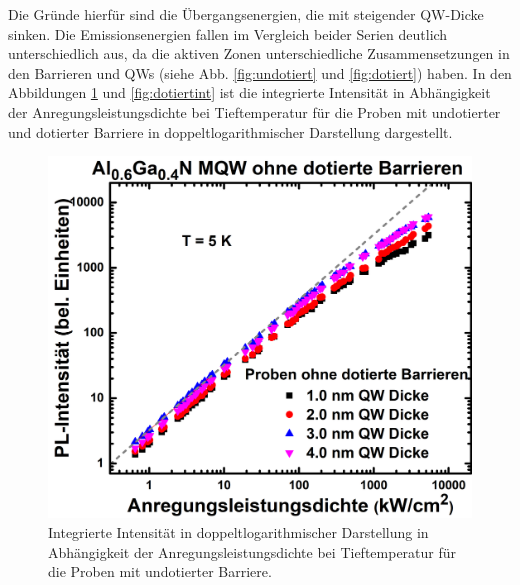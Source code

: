 \noindent 
Die Gründe hierfür sind die Übergangsenergien, die mit steigender QW-Dicke \cite{doi:10.1063/1.371241} sinken. 
Die Emissionsenergien fallen im Vergleich beider Serien deutlich unterschiedlich aus, da die aktiven Zonen unterschiedliche Zusammensetzungen in den Barrieren und QWs (siehe Abb. \ref{fig:undotiert} und \ref{fig:dotiert}) haben. 
\newline
In den Abbildungen \ref{fig:undotiertint} und \ref{fig:dotiertint} ist die integrierte Intensität in Abhängigkeit der Anregungsleistungsdichte bei Tieftemperatur für die Proben mit undotierter und dotierter Barriere in doppeltlogarithmischer Darstellung dargestellt.
\begin{figure}[H]
  \centering
  \begin{minipage}[t]{0.49\textwidth}
    \centering
    \includegraphics[width=\textwidth]{Bilder/MQWdickenSerie/intTTundotiert.png}
		\caption{Integrierte Intensität in doppeltlogarithmischer Darstellung in Abhängigkeit der Anregungsleistungsdichte bei Tieftemperatur für die Proben mit undotierter Barriere.}
    \label{fig:undotiertint}
  \end{minipage}
	\hfill
  \begin{minipage}[t]{0.49\textwidth}
    \centering

\end{minipage}
\end{figure}
